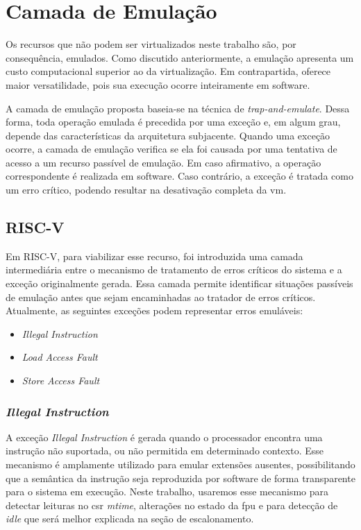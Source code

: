 \section{Camada de Emulação}

Os recursos que não podem ser virtualizados neste trabalho são, por consequência, emulados. Como discutido anteriormente, a
emulação apresenta um custo computacional superior ao da virtualização. Em contrapartida, oferece maior versatilidade,
pois sua execução ocorre inteiramente em software.

A camada de emulação proposta baseia-se na técnica de \textit{trap-and-emulate}. Dessa forma, toda operação emulada é precedida por
uma exceção e, em algum grau, depende das características da arquitetura subjacente. Quando uma exceção ocorre, a camada de
emulação verifica se ela foi causada por uma tentativa de acesso a um recurso passível de emulação.
Em caso afirmativo, a operação correspondente é realizada em software. Caso contrário, a exceção é tratada como um erro
crítico, podendo resultar na desativação completa da \gls{vm}.

\subsection{RISC-V}

Em RISC-V, para viabilizar esse recurso, foi introduzida uma camada intermediária entre o mecanismo de tratamento de erros críticos do sistema e a exceção originalmente
gerada. Essa camada permite identificar situações passíveis de emulação antes que sejam encaminhadas ao tratador de erros críticos. Atualmente, as seguintes exceções
podem representar erros emuláveis:

\begin{itemize}
    \item \textit{Illegal Instruction}
    \item \textit{Load Access Fault}
    \item \textit{Store Access Fault}
\end{itemize}

\subsubsection{\textit{Illegal Instruction}}

A exceção \textit{Illegal Instruction} é gerada quando o processador encontra uma instrução não suportada, ou não permitida em determinado contexto.
Esse mecanismo é amplamente utilizado para emular extensões ausentes, possibilitando que a semântica da instrução seja reproduzida por software de forma transparente para o sistema em execução.
Neste trabalho, usaremos esse mecanismo para detectar leituras no \gls{csr} \textit{mtime}, alterações no estado da \gls{fpu} e para detecção de \textit{idle} que será melhor explicada na seção
de escalonamento.

